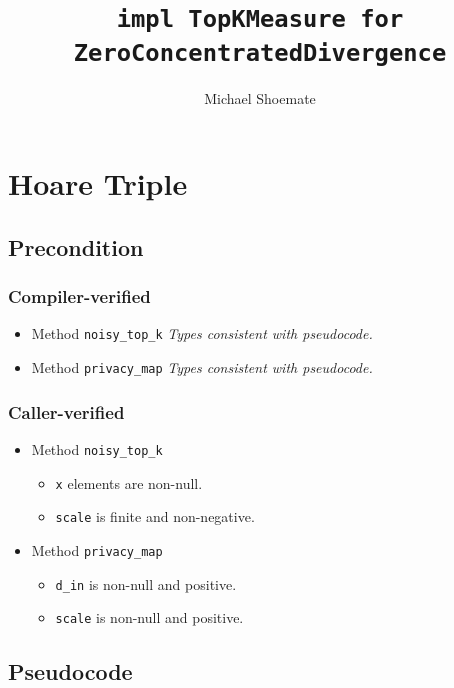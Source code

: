 \documentclass{article}
\title{\texttt{impl TopKMeasure for ZeroConcentratedDivergence}}
\author{Michael Shoemate}
\begin{document}
  
\maketitle 
 
\section{Hoare Triple} 
\subsection*{Precondition} 
\subsubsection*{Compiler-verified}
\begin{itemize}
    \item Method \texttt{noisy\_top\_k}
        \textit{Types consistent with pseudocode.}
    \item Method \texttt{privacy\_map}
        \textit{Types consistent with pseudocode.}
\end{itemize}

\subsubsection*{Caller-verified}
\begin{itemize}
    \item Method \texttt{noisy\_top\_k}
        \begin{itemize}
            \item \texttt{x} elements are non-null.
            \item \texttt{scale} is finite and non-negative.
        \end{itemize}
    \item Method \texttt{privacy\_map}
        \begin{itemize}
            \item \texttt{d\_in} is non-null and positive.
            \item \texttt{scale} is non-null and positive.
        \end{itemize}
\end{itemize}

\subsection*{Pseudocode} 
\label{sec:python-pseudocode} 
 
 
\end{document}
